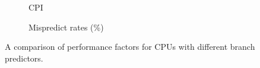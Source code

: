 %
%
%
%
%

\begin{figure}[b!]%
\begin{subfigure}{.5\textwidth}
    \centering
    
    \caption{CPI}
    \label{fig:partd-cpi}
\end{subfigure}%
\begin{subfigure}{.5\textwidth}
    \centering
    
    \caption{Mispredict rates (\%)}
    \label{fig:partd-mispredict}
\end{subfigure}%
\caption{A comparison of performance factors for CPUs with different branch predictors.}
\label{fig:partd-factors}
\end{figure}

